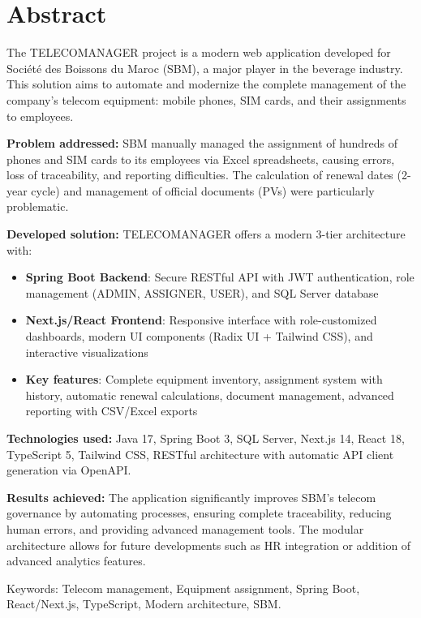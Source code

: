 \documentclass[12pt,a4paper]{report}
\begin{document}
\chapter*{Abstract}
The TELECOMANAGER project is a modern web application developed for Société des Boissons du Maroc (SBM), a major player in the beverage industry. This solution aims to automate and modernize the complete management of the company's telecom equipment: mobile phones, SIM cards, and their assignments to employees.

\textbf{Problem addressed:} SBM manually managed the assignment of hundreds of phones and SIM cards to its employees via Excel spreadsheets, causing errors, loss of traceability, and reporting difficulties. The calculation of renewal dates (2-year cycle) and management of official documents (PVs) were particularly problematic.

\textbf{Developed solution:} TELECOMANAGER offers a modern 3-tier architecture with:
\begin{itemize}
\item \textbf{Spring Boot Backend}: Secure RESTful API with JWT authentication, role management (ADMIN, ASSIGNER, USER), and SQL Server database
\item \textbf{Next.js/React Frontend}: Responsive interface with role-customized dashboards, modern UI components (Radix UI + Tailwind CSS), and interactive visualizations
\item \textbf{Key features}: Complete equipment inventory, assignment system with history, automatic renewal calculations, document management, advanced reporting with CSV/Excel exports
\end{itemize}

\textbf{Technologies used:} Java 17, Spring Boot 3, SQL Server, Next.js 14, React 18, TypeScript 5, Tailwind CSS, RESTful architecture with automatic API client generation via OpenAPI.

\textbf{Results achieved:} The application significantly improves SBM's telecom governance by automating processes, ensuring complete traceability, reducing human errors, and providing advanced management tools. The modular architecture allows for future developments such as HR integration or addition of advanced analytics features.

Keywords: Telecom management, Equipment assignment, Spring Boot, React/Next.js, TypeScript, Modern architecture, SBM.

\end{document}
